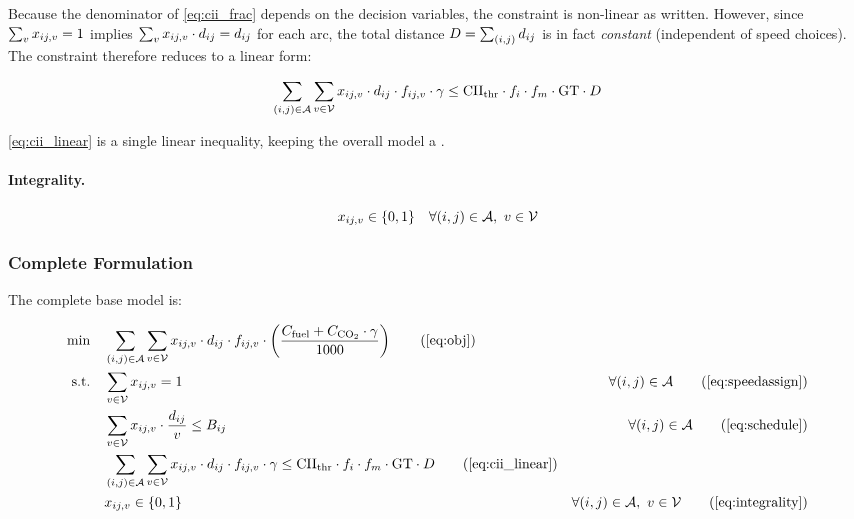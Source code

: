 Because the denominator of \cref{eq:cii_frac} depends on the decision
variables, the constraint is non-linear as written. However, since
$\sum_{v} x_{ij,v} = 1$ implies $\sum_{v} x_{ij,v} \cdot d_{ij} = d_{ij}$ for
each arc, the total distance $D = \sum_{(i,j)} d_{ij}$ is in fact
\textit{constant} (independent of speed choices). The constraint
therefore reduces to a linear form:

\begin{equation}
  \sum_{(i,j)\in\mathcal{A}} \sum_{v\in\mathcal{V}}
    x_{ij,v} \cdot d_{ij} \cdot f_{ij,v} \cdot \gamma
  \leq \mathrm{CII}_{\mathrm{thr}} \cdot f_i \cdot f_m \cdot \mathrm{GT} \cdot D
  \label{eq:cii_linear}
\end{equation}

\noindent \cref{eq:cii_linear} is a single linear inequality, keeping the
overall model a \MILP{}.

\paragraph{Integrality.}
\begin{equation}
  x_{ij,v} \in \{0,1\} \quad \forall (i,j) \in \mathcal{A},\ v \in \mathcal{V}
  \label{eq:integrality}
\end{equation}

\subsubsection{Complete Formulation}
\label{sec:model:complete}

The complete base model is:

\begin{align}
  \min \quad & \sum_{(i,j)\in\setA} \sum_{v\in\setV}
    \xvar \cdot \dist \cdot \fuelrate
    \cdot \left( \frac{C_{\mathrm{fuel}} + C_{\mathrm{CO}_2}\cdot\gamma}
                      {1000} \right)
    \tag{\ref{eq:obj}} \\
  \text{s.t.} \quad
  & \sum_{v\in\setV} \xvar = 1
    & \forall (i,j)\in\setA
    \tag{\ref{eq:speedassign}} \\
  & \sum_{v\in\setV} \xvar \cdot \frac{\dist}{v} \leq \budget
    & \forall (i,j)\in\setA
    \tag{\ref{eq:schedule}} \\
  & \sum_{(i,j)\in\setA} \sum_{v\in\setV}
      \xvar \cdot \dist \cdot \fuelrate \cdot \gamma
    \leq \ciithr \cdot f_i \cdot f_m \cdot \GT \cdot D
    \tag{\ref{eq:cii_linear}} \\
  & \xvar \in \{0,1\}
    & \forall (i,j)\in\setA,\ v\in\setV
    \tag{\ref{eq:integrality}}
\end{align}

